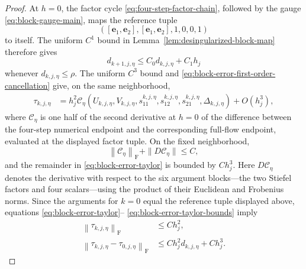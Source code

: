 \documentclass[]{article}
\numberwithin{equation}{section}
\theoremstyle{plain}
\theoremstyle{remark}
\newcommand{\F}{\mathrm F}
\newcommand{\norm}[1]{\left\lVert #1\right\rVert}
\begin{document}
\begin{proof}
At $h=0$, the factor cycle
\eqref{eq:four-step-factor-chain}, followed by the gauge
\eqref{eq:block-gauge-main}, maps the reference tuple
\[
 ([\boldsymbol e_1,\boldsymbol e_2],
  [\boldsymbol e_1,\boldsymbol e_2],1,0,0,1)
\]
to itself.  The uniform $C^1$ bound in
Lemma~\ref{lem:desingularized-block-map} therefore gives
\begin{equation}\label{eq:block-factor-distance-recurrence}
 d_{k+1,j,\eta}
 \le C_0d_{k,j,\eta}+C_1h_j
\end{equation}
whenever $d_{k,j,\eta}\le\rho$.
The uniform $C^3$ bound and
\eqref{eq:block-error-first-order-cancellation} give, on the same
neighborhood,
\begin{align}
 \tau_{k,j,\eta}
 &=h_j^2\mathcal C_\eta
   (U_{k,j,\eta},V_{k,j,\eta},s_{11}^{k,j,\eta},
    s_{12}^{k,j,\eta},s_{21}^{k,j,\eta},\Delta_{k,j,\eta})
   +O(h_j^3),
 \label{eq:block-error-taylor}
\end{align}
where $\mathcal C_\eta$ is one half of the second derivative at $h=0$
of the difference between the four-step numerical endpoint and the
corresponding full-flow endpoint, evaluated at the displayed factor
tuple.  On the fixed neighborhood,
\begin{equation}\label{eq:block-error-taylor-bounds}
 \norm{\mathcal C_\eta}_{\F}
 +\|D\mathcal C_\eta\|\le C,
\end{equation}
and the remainder in \eqref{eq:block-error-taylor} is bounded by
$Ch_j^3$.
Here $D\mathcal C_\eta$ denotes the derivative with respect to the six
argument blocks---the two Stiefel factors and four scalars---using the
product of their Euclidean and Frobenius norms.  Since the arguments for
$k=0$ equal the reference
tuple displayed above,
equations \eqref{eq:block-error-taylor}--
\eqref{eq:block-error-taylor-bounds} imply
\begin{align}
 \norm{\tau_{k,j,\eta}}_{\F}
 &\le Ch_j^2,
 \label{eq:block-error-direct-bound}\\
 \norm{\tau_{k,j,\eta}-\tau_{0,j,\eta}}_{\F}
 &\le Ch_j^2d_{k,j,\eta}+Ch_j^3.
 \label{eq:block-error-start-dependence}
\end{align}


\end{proof}
\end{document}
